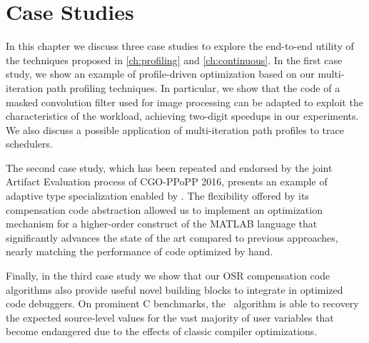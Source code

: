 \chapter{Case Studies}
\label{ch:case-studies}

In this chapter we discuss three case studies to explore the end-to-end utility of the techniques proposed in \mychapter\ref{ch:profiling} and \mychapter\ref{ch:continuous}. In the first case study, we show an example of profile-driven optimization based on our multi-iteration path profiling techniques. In particular, we show that the code of a masked convolution filter used for image processing can be adapted to exploit the characteristics of the workload, achieving two-digit speedups in our experiments. We also discuss a possible application of multi-iteration path profiles to trace schedulers.

The second case study, which has been repeated and endorsed by the joint Artifact Evaluation process of CGO-PPoPP 2016, presents an example of adaptive type specialization enabled by \osrkit. The flexibility offered by its compensation code abstraction allowed us to implement an optimization mechanism for a higher-order construct of the MATLAB language that significantly advances the state of the art compared to previous approaches, nearly matching the performance of code optimized by hand.


Finally, in the third case study we show that our OSR compensation code algorithms also provide useful novel building blocks to integrate in optimized code debuggers. On prominent C benchmarks, the \reconstruct\ algorithm is able to recovery the expected source-level values for the vast majority of user variables that become endangered due to the effects of classic compiler optimizations.






